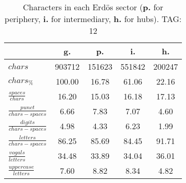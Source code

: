 \begin{table}[h!]
\begin{center}
\begin{tabular}{| l || c | c | c | c |}\hline
 & {\bf g.} & {\bf p.} & {\bf i.} & {\bf h.} \\\hline\hline
$chars$ & 903712  & 151623  & 551842  & 200247 \\
$chars_{\%}$ & 100.00  & 16.78  & 61.06  & 22.16 \\\hline
$\frac{spaces}{chars}$ & 16.20  & 15.03  & 16.18  & 17.13 \\
$\frac{punct}{chars-spaces}$ & 6.66  & 7.83  & 7.07  & 4.60 \\
$\frac{digits}{chars-spaces}$ & 4.98  & 4.33  & 6.23  & 1.99 \\\hline
$\frac{letters}{chars-spaces}$ & 86.25  & 85.69  & 84.45  & 91.71 \\
$\frac{vogals}{letters}$ & 34.48  & 33.89  & 34.04  & 36.01 \\
$\frac{uppercase}{letters}$ & 7.60  & 8.82  & 8.34  & 4.82 \\\hline
\end{tabular}
\caption{Characters in each Erd\"os sector ({{\bf p.}} for periphery, {{\bf i.}} for intermediary, 
    {{\bf h.}} for hubs). TAG: 12}
\end{center}
\end{table}
